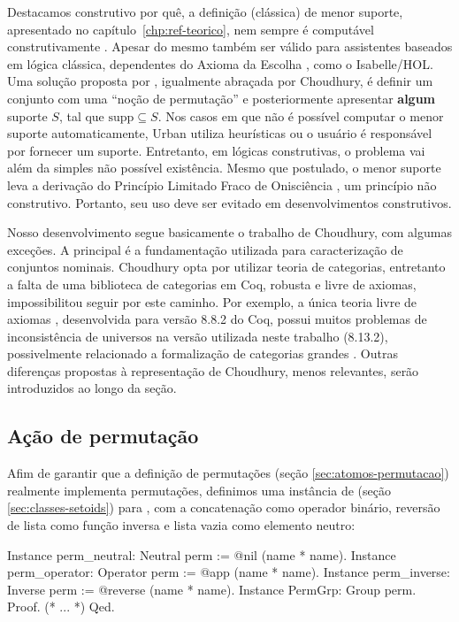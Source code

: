 Destacamos construtivo por quê, a definição (clássica) de menor suporte, apresentado no capítulo~\ref{chp:ref-teorico}, nem sempre é computável construtivamente \cite{Swan2016,Swan2017}. Apesar do mesmo também ser válido para assistentes baseados em lógica clássica, dependentes do Axioma da Escolha \cite{Pitts2006}, como o Isabelle/HOL. Uma solução proposta por \cite{Urban2008}, igualmente abraçada por Choudhury, é definir um conjunto com uma ``noção de permutação'' e posteriormente apresentar \textbf{algum} suporte $S$, tal que $\text{supp} \subseteq S$. Nos casos em que não é possível computar o menor suporte automaticamente, Urban utiliza heurísticas ou o usuário é responsável por fornecer um suporte. Entretanto, em lógicas construtivas, o problema vai além da simples não possível existência. Mesmo que postulado, o menor suporte leva a derivação do Princípio Limitado Fraco de Onisciência \cite{Swan2017}, um princípio não construtivo. Portanto, seu uso deve ser evitado em desenvolvimentos construtivos. 


Nosso desenvolvimento segue basicamente o trabalho de Choudhury, com algumas exceções. A principal é a fundamentação utilizada para caracterização de conjuntos nominais. Choudhury opta por utilizar teoria de categorias, entretanto a falta de uma biblioteca de categorias em Coq, robusta e livre de axiomas, impossibilitou seguir por este caminho. Por exemplo, a única teoria livre de axiomas \cite{Wiegley}, desenvolvida para versão 8.8.2 do Coq, possui muitos problemas de inconsistência de universos na versão utilizada neste trabalho (8.13.2), possivelmente relacionado a formalização de categorias grandes \cite{Gross2014}. Outras diferenças propostas à representação de Choudhury, menos relevantes, serão introduzidos ao longo da seção.

\subsection{Ação de permutação}
Afim de garantir que a definição de permutações (seção \ref{sec:atomos-permutacao}) realmente implementa permutações, definimos uma instância de  (seção \ref{sec:classes-setoids}) para , com a concatenação como operador binário, reversão de lista como função inversa e lista vazia como elemento neutro:
\begin{coqcode}
Instance perm_neutral: Neutral perm := @nil (name * name).
Instance perm_operator: Operator perm := @app (name * name).
Instance perm_inverse: Inverse perm := @reverse (name * name).
Instance PermGrp: Group perm. Proof. (* ... *) Qed.
\end{coqcode}

